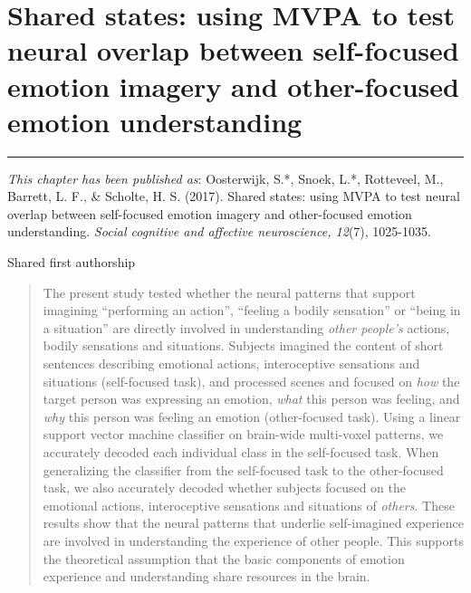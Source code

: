 \documentclass[12pt,american,a4paper,oneside,]{memoir} %
\begin{document}
\hypertarget{shared-states}{%
\chapter{Shared states: using MVPA to test neural overlap between self-focused emotion imagery and other-focused emotion understanding}\label{shared-states}}


\vspace*{\fill}

\begin{center}\rule{0.5\linewidth}{0.5pt}\end{center}

\small

\noindent
\emph{This chapter has been published as}: Oosterwijk, S.*, Snoek, L.*, Rotteveel, M., Barrett, L. F., \& Scholte, H. S. (2017). Shared states: using MVPA to test neural overlap between self-focused emotion imagery and other-focused emotion understanding. \emph{Social cognitive and affective neuroscience, 12}(7), 1025-1035.

\vspace{3mm}

\noindent * Shared first authorship
\newpage
\normalsize

\begin{abstract}
The present study tested whether the neural patterns that support imagining ``performing an action'', ``feeling a bodily sensation'' or ``being in a situation'' are directly involved in understanding \emph{other people's} actions, bodily sensations and situations. Subjects imagined the content of short sentences describing emotional actions, interoceptive sensations and situations (self-focused task), and processed scenes and focused on \emph{how} the target person was expressing an emotion, \emph{what} this person was feeling, and \emph{why} this person was feeling an emotion (other-focused task). Using a linear support vector machine classifier on brain-wide multi-voxel patterns, we accurately decoded each individual class in the self-focused task. When generalizing the classifier from the self-focused task to the other-focused task, we also accurately decoded whether subjects focused on the emotional actions, interoceptive sensations and situations of \emph{others}. These results show that the neural patterns that underlie self-imagined experience are involved in understanding the experience of other people. This supports the theoretical assumption that the basic components of emotion experience and understanding share resources in the brain.
\end{abstract} \newpage
\end{document}
